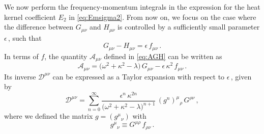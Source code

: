\documentclass[11pt]{article}
\newcommand{\be}{\begin{equation}}
\newcommand{\ee}{\end{equation}}
\newcommand{\CA}{\mathcal{A}}
\newcommand{\CD}{\mathcal{D}}
\begin{document}
We now perform the frequency-momentum integrals in the expression for the heat kernel coefficient $E_2$ in \eqref{eq:Emsigma2}. From now on, we focus on the case where the difference between $G_{\mu\nu}$ and $H_{\mu\nu}$ is controlled by a sufficiently small parameter $\epsilon$\,, such that
%
\be \label{eq:GminusH}
	G_{\mu\nu} - H_{\mu\nu} = \epsilon \, f_{\mu\nu}\,.
\ee
%
In terms of $f$, the quantity $\CA_{\mu\nu}$ defined in \eqref{eq:AGH} can be written as
%
\be
	\CA_{\mu\nu} = \bigl( \omega^2 + \kappa^2 - \lambda \bigr) \, G_{\mu\nu} - \epsilon \, \kappa^2 \, f_{\mu\nu}\,.
\ee
%
Its inverse $\CD^{\mu\nu}$ can be expressed as a Taylor expansion with respect to $\epsilon$\,, given by
%
\be \label{eq:Dexp}
	\CD^{\mu\nu} = \sum_{n=0}^\infty \frac{\epsilon^n \, \kappa^{2n}}{\bigl(\omega^2 + \kappa^2 - \lambda \bigr)^{n+1}} \, ( g^n )^{\mu}{}_{\rho} \, G^{\rho\nu}\,,
\ee
%
where we defined the matrix $g = (g^\mu{}_\nu)$ with
%
\be \label{eq:defg}
	g^\mu{}_\nu \equiv G^{\mu\rho} \, f_{\rho\nu}\,.
\ee
\end{document}
